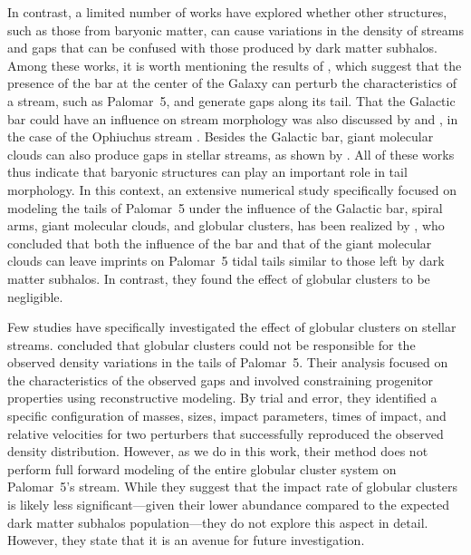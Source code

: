 \documentclass{aa}
\begin{document}
  In contrast, a limited number of works have explored whether other structures, such as those from baryonic matter, can cause variations in the density of streams and gaps that can be confused with those produced by dark matter subhalos.  Among these works, it is worth mentioning the results of \citet{2017NatAs...1..633P}, which suggest that the presence of the bar at the center of the Galaxy can perturb the characteristics of a stream, such as Palomar~5, and generate gaps along its tail. That the Galactic bar could have an influence on stream morphology was also discussed by \citet{2016MNRAS.460..497H} and \citet{2016ApJ...824..104P}, in the case of the Ophiuchus stream \citep{2014MNRAS.443L..84B}. Besides the Galactic bar, giant molecular clouds can also produce gaps in stellar streams, as shown by \citet{2016MNRAS.463L..17A}. All of these works thus indicate that baryonic structures can play an important role in tail morphology. In this context,  an extensive numerical study specifically focused on modeling the tails of Palomar~5 under the influence of the Galactic bar, spiral arms, giant molecular clouds, and globular clusters, has been realized by \citet{2019MNRAS.484.2009B}, who concluded that both the influence of the bar and that of the giant molecular clouds can leave imprints on Palomar~5 tidal tails similar to those left by dark matter subhalos. In contrast, they found the effect of globular clusters to be negligible. 
  
  Few studies have specifically investigated the effect of globular clusters on stellar streams. \citet{2017MNRAS.470...60E} concluded that globular clusters could not be responsible for the observed density variations in the tails of Palomar~5. Their analysis focused on the characteristics of the observed gaps and involved constraining progenitor properties using reconstructive modeling. By trial and error, they identified a specific configuration of masses, sizes, impact parameters, times of impact, and relative velocities for two perturbers that successfully reproduced the observed density distribution. However, as we do in this work, their method does not perform full forward modeling of the entire globular cluster system on Palomar~5's stream. While they suggest that the impact rate of globular clusters is likely less significant---given their lower abundance compared to the expected dark matter subhalos population---they do not explore this aspect in detail. However, they state that it is an avenue for future investigation. 
  
\end{document}
